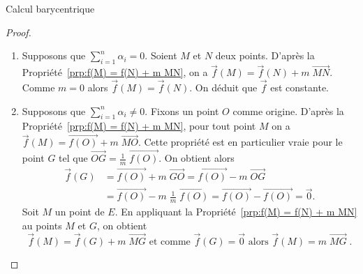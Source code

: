 \begin{chapter}{Calcul barycentrique}
\begin{prp}
\begin{proof}
\begin{enumerate}
			\item Supposons que $\sum_{i = 1}^{n} \alpha_i = 0$. 
				Soient $M$ et $N$ deux points.
				D'apr\`es la Propri\'et\'e~\ref{prp:f(M) = f(N) + m MN}, 
				on a $\vec{f}(M) = \vec{f}(N) + m \; \overrightarrow{MN}$.
				Comme $m = 0$ alors $\vec{f}(M) = \vec{f}(N)$.
				On d\'eduit que $\vec{f}$ est constante.
			\item Supposons que $\sum_{i = 1}^{n} \alpha_i \neq 0$. 
				Fixons un point $O$ comme origine. 
				D'apr\`es la Propri\'et\'e~\ref{prp:f(M) = f(N) + m MN}, 
				pour tout point $M$ on a $\vec{f}(M) = \overrightarrow{f(O)} + m \; \overrightarrow{MO}$.
				Cette propri\'et\'e est en particulier vraie pour le point $G$ tel que
				$\overrightarrow{OG} = \frac{1}{m} \; \overrightarrow{f(O)}$.
				On obtient alors 
				\begin{align*}
					\vec{f}(G) & = \overrightarrow{f(O)} + m \;\overrightarrow{GO}                 
						  = \overrightarrow{f(O)} - m \;\overrightarrow{OG}                         \\
						& = \overrightarrow{f(O)} - m \; \frac{1}{m} \; \overrightarrow{f(O)}       
						  = \overrightarrow{f(O)} - \overrightarrow{f(O)}                           
						  = \vec{0}                                           .
				\end{align*}
				Soit $M$ un point de $E$.
				En appliquant la Propri\'et\'e~\ref{prp:f(M) = f(N) + m MN} au points $M$ et $G$, on obtient 
				$$
					\vec{f}(M) = \vec{f}(G) + m \; \overrightarrow{MG} 
							\text{ et comme $\vec{f}(G) = \vec{0}$ alors } \vec{f}(M) 
						= m \; \overrightarrow{MG} 
					\; .
				$$
		\end{enumerate}
	\end{proof}
\end{prp}
%
%

\end{chapter}
